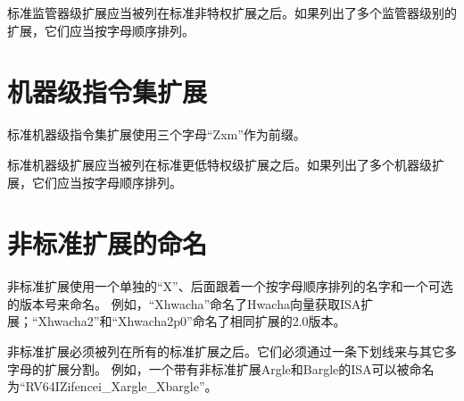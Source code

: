 标准监管器级扩展应当被列在标准非特权扩展之后。如果列出了多个监管器级别的扩展，它们应当按字母顺序排列。

\section{机器级指令集扩展}

标准机器级指令集扩展使用三个字母“Zxm”作为前缀。

标准机器级扩展应当被列在标准更低特权级扩展之后。如果列出了多个机器级扩展，它们应当按字母顺序排列。

\section{非标准扩展的命名}

非标准扩展使用一个单独的“X”、后面跟着一个按字母顺序排列的名字和一个可选的版本号来命名。
例如，“Xhwacha”命名了Hwacha向量获取ISA扩展；“Xhwacha2”和“Xhwacha2p0”命名了相同扩展的2.0版本。

非标准扩展必须被列在所有的标准扩展之后。它们必须通过一条下划线来与其它多字母的扩展分割。
例如，一个带有非标准扩展Argle和Bargle的ISA可以被命名为“RV64IZifencei_Xargle_Xbargle”。

